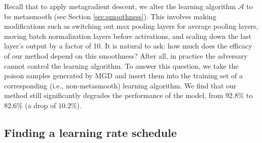 \begin{remark}
  Recall that to apply metagradient descent,
  we alter the learning algorithm $\mathcal{A}$
  to be metasmooth (see Section \ref{sec:smoothness}).
  This involves making modifications such as switching out
  max pooling layers for average pooling layers,
  moving batch normalization layers before activations,
  and scaling down the last layer's output by a factor of 10.
  It is natural to ask: how much does the efficacy of our method
  depend on this smoothness?
  After all, in practice the adversary cannot control the learning algorithm.
  To answer this question, we take the poison samples generated by
  MGD and insert them into the training set of a corresponding
   (i.e., non-metasmooth) learning algorithm.
  We find that our method still
  significantly degrades the performance of the model,
  from $92.8\%$ to $82.6\%$ (a drop of $10.2\%$).
\end{remark}

\subsection{Finding a learning rate schedule}
\label{sec:lrsched}

